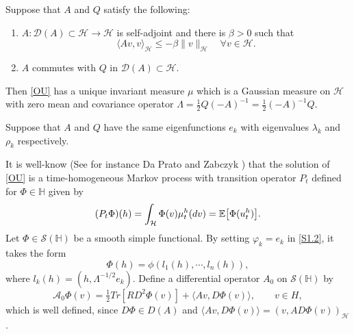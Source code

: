 \documentclass[review, onefignum, onetabnum]{siamart171218}
\begin{document}
\begin{lemma} \label{lemma-AQ}
    Suppose that $A$ and $Q$ satisfy the following:
    \begin{enumerate}
        \item
            $A:\mathcal{D}(A)\subset \mathcal{H}\rightarrow \mathcal{H}$ is
            self-adjoint and there is $\beta>0$ such that
            \[
                \langle Av,v\rangle_ \mathcal{H}\le -\beta\|v
                \|_\mathcal{H}\quad
                \forall v\in \mathcal{H}.
            \]
        \item $A$ commutes with $Q$ in $\mathcal{D}(A)\subset \mathcal{H}$.
    \end{enumerate}
    Then \eqref{OU} has a unique invariant measure $\mu$ which is a Gaussian
    measure on $ \mathcal{H}$ with zero mean and covariance
    operator
    $
        \Lambda=
            \tfrac{1}{2}Q(-A)^{-1}
            =\tfrac{1}{2}(-A)^{-1}Q
    $.
\end{lemma}


Suppose that $A$ and $Q$ have the same eigenfunctions $e_k$ with eigenvalues
$\lambda_k$ and $\rho_k$ respectively.

    It is well-know (See for instance Da Prato and Zabczyk \cite{da-za}) that
the solution of \eqref{OU} is a time-homogeneous Markov process with transition
operator $P_t$  defined for $\Phi\in\mathbb{H}$ given by
\begin{equation}
    (P_t\Phi)(h)=
        \int_{\mathcal{H}}
             \Phi(v) \mu_t ^ h(dv)
             = \mathbb{E}
             \big[
                \Phi(u_t^h)
             \big].
\end{equation}
    Let $\Phi\in\mathcal{S}(\mathbb{H})$ be a smooth simple functional. By
setting $\varphi_k = e_k$ in \eqref{S1.2}, it takes the form
\[
  \Phi(h) = \phi(l_1(h), \cdots, l_n (h)),
\]
where $l_k(h) = (h, \Lambda^{-1/2} e_k )$. Define a differential operator
$A_0$
on $\mathcal{S}(\mathbb{H})$ by
\begin{equation}\label{def-A0}
  \mathcal{A}_0
    \Phi(v) = \tfrac{1}{2}Tr [RD^2 \Phi(v)] + \langle Av, D\Phi(v)\rangle
    ,\qquad v \in H,
\end{equation}
which is well defined, since $D\Phi \in D(A)$ and
$\langle Av, D\Phi(v)\rangle = (v, A D \Phi(v))_\mathcal{H}$.
\end{document}
